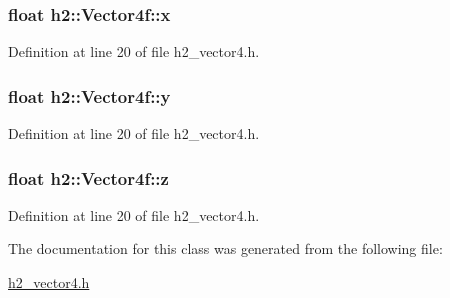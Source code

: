 \hypertarget{classh2_1_1_vector4f_adac3565214ca8c155656652eb63de199}{
\subsubsection[{x}]{\setlength{\rightskip}{0pt plus 5cm}float h2\-::\-Vector4f\-::x}}\label{classh2_1_1_vector4f_adac3565214ca8c155656652eb63de199}


Definition at line 20 of file h2\-\_\-vector4.\-h.

\hypertarget{classh2_1_1_vector4f_a55b852da5da18182eade72cc31a24c07}{
\subsubsection[{y}]{\setlength{\rightskip}{0pt plus 5cm}float h2\-::\-Vector4f\-::y}}\label{classh2_1_1_vector4f_a55b852da5da18182eade72cc31a24c07}


Definition at line 20 of file h2\-\_\-vector4.\-h.

\hypertarget{classh2_1_1_vector4f_a537a0df644f481fc056c92d484644dcd}{
\subsubsection[{z}]{\setlength{\rightskip}{0pt plus 5cm}float h2\-::\-Vector4f\-::z}}\label{classh2_1_1_vector4f_a537a0df644f481fc056c92d484644dcd}


Definition at line 20 of file h2\-\_\-vector4.\-h.



The documentation for this class was generated from the following file\-:\begin{DoxyCompactItemize}
\item 
\hyperlink{h2__vector4_8h}{h2\-\_\-vector4.\-h}\end{DoxyCompactItemize}
